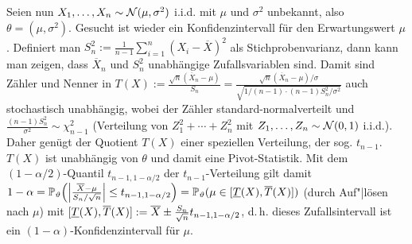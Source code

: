 \linie

\begin{Bsp}
    Seien nun $X_1, \dotsc, X_n \sim \mathcal{N}(\mu, \sigma^2)$ i.i.d.
    mit $\mu$ und $\sigma^2$ unbekannt, also $\theta = (\mu, \sigma^2)$.
    Gesucht ist wieder ein Konfidenzintervall für den Erwartungswert $\mu$.
    Definiert man $S_n^2 := \frac{1}{n-1} \sum_{i=1}^n (X_i - \overline{X})^2$ als
    Stichprobenvarianz, dann kann man zeigen,
    dass $\overline{X}_n$ und $S_n^2$ unabhängige Zufallsvariablen sind.
    Damit sind Zähler und Nenner in $T(X) := \frac{\sqrt{n} (\overline{X}_n - \mu)}{S_n} =
    \frac{\sqrt{n} (\overline{X}_n - \mu)/\sigma}{\sqrt{1/(n-1) \cdot (n-1) S_n^2/\sigma^2}}$
    auch stochastisch unabhängig,
    wobei der Zähler standard-normalverteilt und
    $\frac{(n-1)S_n^2}{\sigma^2} \sim \chi_{n-1}^2$
    (Verteilung von $Z_1^2 + \dotsb + Z_n^2$ mit $Z_1, \dotsc, Z_n \sim \mathcal{N}(0,1)$ i.i.d.).
    Daher genügt der Quotient $T(X)$ einer speziellen Verteilung, der sog.
     $t_{n-1}$.
    $T(X)$ ist unabhängig von $\theta$ und damit eine Pivot-Statistik.
    Mit dem $(1 - \alpha/2)$-Quantil $t_{n-1,1-\alpha/2}$ der $t_{n-1}$-Verteilung
    gilt damit $1 - \alpha
    = \mathbb{P}_\vartheta\!\left(\left|\frac{\overline{X} - \mu}{S_n/\sqrt{n}}\right| \le
    t_{n-1,1-\alpha/2}\right)
    = \mathbb{P}_\vartheta(\mu \in [\underline{T}(X), \overline{T}(X)])$
    (durch Auf"|lösen nach $\mu$) mit
    $[\underline{T}(X), \overline{T}(X)] := \overline{X} \pm \frac{S_n}{\sqrt{n}} t_{n-1,1-\alpha/2}$,
    d.\,h. dieses Zufallsintervall ist ein $(1 - \alpha)$-Konfidenzintervall für $\mu$.
\end{Bsp}

\linie


